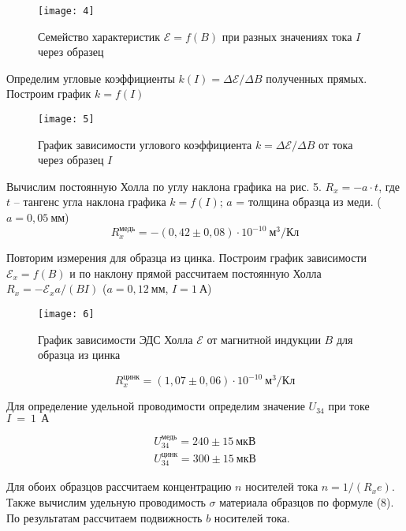 \begin{figure}[H]
    \texttt{[image: 4]} 
    \captionsetup{justification=centering}
    \caption{Семейство характеристик $\mathscr{E} =
    f(B)$ при разных значениях тока  $I$
через образец }
\end{figure}

Определим угловые коэффициенты $k(I) =
\Delta \mathscr{E}/ \Delta B$ полученных
прямых. Построим график $k = f(I)$

\begin{figure}[H]
    \texttt{[image: 5]} 
    \captionsetup{justification=centering}
    \caption{График зависимости углового
    коэффициента $k = \Delta
\mathscr{E}/ \Delta B$ от тока через
образец $I$}
\end{figure}

Вычислим постоянную Холла по углу
наклона графика на рис. 5. $R_x = -a\cdot t$,
где $t$ -- тангенс угла наклона графика
$k = f(I)$; $a$ = толщина образца из
меди. ($a = 0,05 \ \text{мм}$)
\[
    R_x^\text{медь} = -(0,42\pm 0,08)
    \cdot 10^{-10}\ \text{м}^3/\text{Кл} 
\]

Повторим измерения для образца из цинка.
Построим график зависимости
$\mathscr{E}_x = f(B)$ и по наклону
прямой рассчитаем постоянную Холла $R_x
= -\mathscr{E}_x a/(B I)$ ($a = 0,12\
\text{мм}$, $I = 1\ \text{А}$)

\begin{figure}[H]
    \texttt{[image: 6]} 
    \captionsetup{justification=centering}
    \caption{График зависимости ЭДС
    Холла  $\mathscr{E}$ от магнитной
индукции  $B$ для образца из цинка}
\end{figure}


\[
    R_x^{\text{цинк}} = (1,07 \pm 0,06)
    \cdot 10^{-10} \ \text{м}^3/\text{Кл}
\]

Для определение удельной проводимости
определим значение $U_{34}$ при токе $I
~=~1~\ \text{А}$ 

\begin{equation*}
    \begin{aligned}
        U_{34}^\text{медь} = 240\pm 15 \
        \text{мкВ}\\
        U_{34}^\text{цинк} = 300\pm 15\
        \text{мкВ}
    \end{aligned}
\end{equation*}


Для обоих образцов рассчитаем
концентрацию $n$ носителей тока $n =
1/(R_x e)$. Также вычислим удельную
проводимость $\sigma$ материала образцов
по формуле (8). По результатам
рассчитаем подвижность $b$ носителей
тока.



